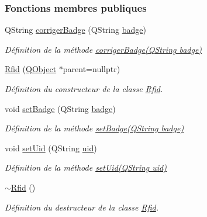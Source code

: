 \subsubsection*{Fonctions membres publiques}
\begin{DoxyCompactItemize}
\item 
Q\+String \hyperlink{class_rfid_afb99366646ac75b7e1d28302d38bf4f2}{corriger\+Badge} (Q\+String \hyperlink{class_rfid_ac634cd26ffbe1c6da3967dc4af53b734}{badge})
\begin{DoxyCompactList}\small\item\em Définition de la méthode \hyperlink{class_rfid_afb99366646ac75b7e1d28302d38bf4f2}{corriger\+Badge(\+Q\+String badge)} \end{DoxyCompactList}\item 
\hyperlink{class_rfid_aa00c7163ce0e3fda6596353d40a458a9}{Rfid} (\hyperlink{class_q_object}{Q\+Object} $\ast$parent=nullptr)
\begin{DoxyCompactList}\small\item\em Définition du constructeur de la classe \hyperlink{class_rfid}{Rfid}. \end{DoxyCompactList}\item 
void \hyperlink{class_rfid_a51021c0899dab1d5fb08e3dd6d93e425}{set\+Badge} (Q\+String \hyperlink{class_rfid_ac634cd26ffbe1c6da3967dc4af53b734}{badge})
\begin{DoxyCompactList}\small\item\em Définition de la méthode \hyperlink{class_rfid_a51021c0899dab1d5fb08e3dd6d93e425}{set\+Badge(\+Q\+String badge)} \end{DoxyCompactList}\item 
void \hyperlink{class_rfid_ac79b994b32bf7a7cbad9d9988e721564}{set\+Uid} (Q\+String \hyperlink{class_rfid_a157b71d282a7e067c65b431dbae6c6c8}{uid})
\begin{DoxyCompactList}\small\item\em Définition de la méthode \hyperlink{class_rfid_ac79b994b32bf7a7cbad9d9988e721564}{set\+Uid(\+Q\+String uid)} \end{DoxyCompactList}\item 
\hyperlink{class_rfid_a563836053a71a9fdc566a812da0cf5c1}{$\sim$\+Rfid} ()
\begin{DoxyCompactList}\small\item\em Définition du destructeur de la classe \hyperlink{class_rfid}{Rfid}. \end{DoxyCompactList}\end{DoxyCompactItemize}
